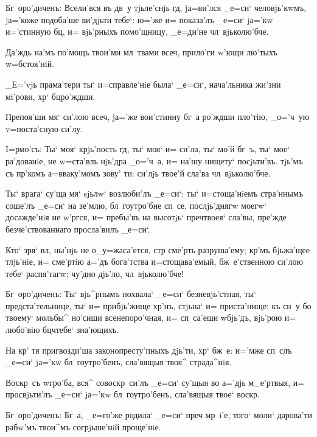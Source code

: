 Бг~оро'диченъ: Всели'вся въ дв~у тjьле'снjь гд, 
jа=ви'лся _е=си` человjь'кwмъ, jа='коже подоба'ше 
ви'дjьти тебе`: ю='же и= показа'лъ _е=си` jа='кw 
и='стинную бц, и= вjь'рныхъ помо'щницу, _е=ди'не 
чл~вjьколю'бче.


Да'ждь на'мъ по'мощь твои'ми мл~твами всеч, 
прило'ги w'ющи лю'тыхъ w=бстоя'нiй.

_Е='vjь прама'тери ты` и=справле'нiе была` _е=си`, 
нача'льника жи'зни мi'рови, хр` бц ро'ждши.

Препоя'ши мя` си'лою всеч, jа='же вои'стинну бг~а 
ро'ждши пло'тiю, _о='ч~ую v=поста'сную си'лу.


I=рмо'съ: Ты` моя` крjь'пость гд, ты` моя` и= 
си'ла, ты` мо'й бг~ъ, ты` мое` ра'дованiе, не w=ста'вль 
нjь'дра _о='ч~а, и= на'шу нищету` посjьти'въ. тjь'мъ съ 
пр'комъ а=вваку'момъ зову' ти: си'лjь твое'й сла'ва 
чл~вjьколю'бче.

Ты` врага` су'ща мя` sjьлw` возлюби'лъ _е=си`: ты` 
и=стоща'нiемъ стра'ннымъ соше'лъ _е=си` на зе'млю, 
бл~гоутро'бне сп~се, послjь'днягw моегw` досажде'нiя не 
w'ргся, и= пребы'въ на высотjь` преч твоея` 
сла'вы, пре'жде безче'ствованнаго просла'вилъ _е=си`.

Кто` зря` вл, ны'нjь не о_у=жаса'ется, стр 
сме'рть разруша'ему; кр'мъ бjьжа'щее тлjь'нiе, и= 
сме'ртiю а='дъ бога'тства и=стощава'емый, бж~е'ственною 
си'лою тебе` распя'тагw; чу'дно дjь'ло, чл~вjьколю'бче!

Бг~оро'диченъ: Ты` вjь^рнымъ похвала` _е=си` 
безневjь'стная, ты` предста'тельнице, ты` и= прибjь'жище 
хр'нъ, стjьна` и= приста'нище: къ сн~у бо твоему` 
мольбы^ но'сиши всенепоро'чная, и= сп~са'еши w\т бjь'дъ, 
вjь'рою и= любо'вiю бц ч тебе` зна'ющихъ.


На кр' тя пригвозди'ша законопресту'пныхъ дjь'ти, 
хр` бж~е: и='мже сп~слъ _е=си` jа='кw бл~гоутро'бенъ, 
сла'вящыя твоя^ страда^нiя.

Воскр~съ w\т гро'ба, вся^ совоскр~си'лъ _е=си` су'щыя 
во а='дjь м_е'ртвыя, и= просвjьти'лъ _е=си` jа='кw 
бл~гоутро'бенъ, сла'вящыя твое` воскр.

Бг~оро'диченъ: Бг~а, _е=го'же родила` _е=си` преч 
мр~i'е, того` моли` дарова'ти рабw'мъ твои^мъ 
согрjьше'нiй проще'нiе.


